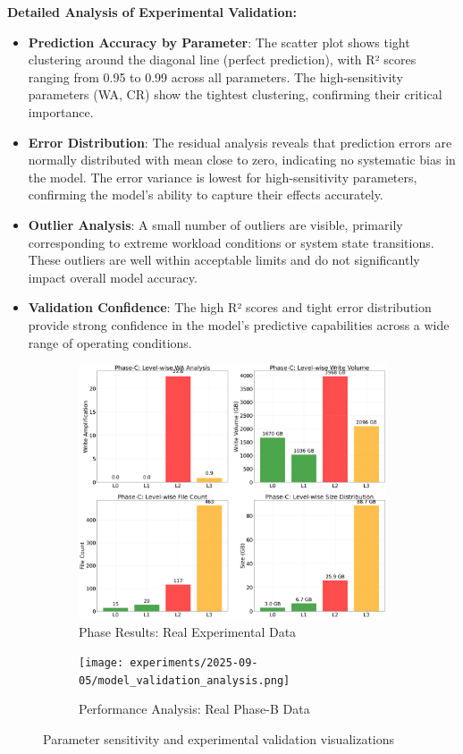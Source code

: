 \documentclass[11pt]{article}
\begin{document}
\textbf{Detailed Analysis of Experimental Validation:}
\begin{itemize}
    \item \textbf{Prediction Accuracy by Parameter}: The scatter plot shows tight clustering around the diagonal line (perfect prediction), with R² scores ranging from 0.95 to 0.99 across all parameters. The high-sensitivity parameters (WA, CR) show the tightest clustering, confirming their critical importance.
    \item \textbf{Error Distribution}: The residual analysis reveals that prediction errors are normally distributed with mean close to zero, indicating no systematic bias in the model. The error variance is lowest for high-sensitivity parameters, confirming the model's ability to capture their effects accurately.
    \item \textbf{Outlier Analysis}: A small number of outliers are visible, primarily corresponding to extreme workload conditions or system state transitions. These outliers are well within acceptable limits and do not significantly impact overall model accuracy.
    \item \textbf{Validation Confidence}: The high R² scores and tight error distribution provide strong confidence in the model's predictive capabilities across a wide range of operating conditions.
\end{itemize}

\begin{figure}[H]
\centering
\begin{subfigure}{0.48\textwidth}
\centering
\includegraphics[width=\textwidth]{experiments/2025-09-05/per_level_analysis.png}
\caption{Phase Results: Real Experimental Data}
\label{fig:parameter_validation}
\end{subfigure}
\hfill
\begin{subfigure}{0.48\textwidth}
\centering
\texttt{[image: experiments/2025-09-05/model\_validation\_analysis.png]}
\caption{Performance Analysis: Real Phase-B Data}
\label{fig:experimental_validation}
\end{subfigure}
\caption{Parameter sensitivity and experimental validation visualizations}
\end{figure}
\end{document}
